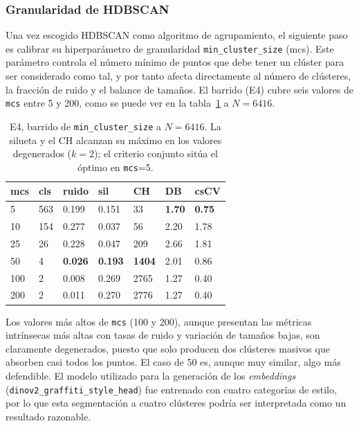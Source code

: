 \subsubsection{Granularidad de HDBSCAN}
\label{subsubsec:res-mincluster}
Una vez escogido HDBSCAN como algoritmo de agrupamiento, el siguiente paso es
calibrar su hiperparámetro de granularidad \texttt{min\_cluster\_size} (mcs).
Este parámetro controla el número mínimo de puntos que debe tener un clúster
para ser considerado como tal, y por tanto afecta directamente al número de
clústeres, la fracción de ruido y el balance de tamaños. El barrido (E4) cubre
seis valores de \texttt{mcs} entre 5 y 200, como se puede ver en la
tabla~\ref{tab:e4-mcs-6416} a $N=6416$.

\begin{table}[h]
  \centering
{\footnotesize
\begin{tabular}{|p{1.4cm}|p{1.0cm}|p{1.0cm}|p{1.0cm}|p{1.2cm}|p{1.0cm}|p{1.0cm}|} \hline
  \textbf{mcs} & \textbf{cls} & \textbf{ruido} & \textbf{sil} & \textbf{CH} & \textbf{DB} & \textbf{csCV} \\ \hline
    5 & 563 & 0.199 & 0.151 &   33 & \textbf{1.70} & \textbf{0.75} \\ \hline
   10 & 154 & 0.277 & 0.037 &   56 & 2.20 & 1.78 \\ \hline
   25 &  26 & 0.228 & 0.047 &  209 & 2.66 & 1.81 \\ \hline
   50 &   4 & \textbf{0.026} & \textbf{0.193} & \textbf{1404} & 2.01 & 0.86 \\ \hline
  100 &   2 & 0.008 & 0.269 & 2765 & 1.27 & 0.40 \\ \hline
  200 &   2 & 0.011 & 0.270 & 2776 & 1.27 & 0.40 \\ \hline
\end{tabular}
}
  \caption[E4, barrido de \texttt{min\_cluster\_size} a $N=6416$]{E4, barrido de \texttt{min\_cluster\_size} a $N=6416$. La silueta y
  el CH alcanzan su máximo en los valores degenerados ($k{=}2$); el criterio
  conjunto sitúa el óptimo en \texttt{mcs}=5. \glosacalidad}
  \label{tab:e4-mcs-6416}
\end{table}

Los valores más altos de \texttt{mcs} (100 y 200), aunque presentan las
métricas intrínsecas más altas con tasas de ruido y variación de tamaños bajas,
son claramente degenerados, puesto que solo producen dos clústeres masivos que
absorben casi todos los puntos. El caso de 50 es, aunque muy similar, algo más
defendible. El modelo utilizado para la generación de los \textit{embeddings}
(\texttt{dinov2\_graffiti\_style\_head}) fue entrenado con cuatro categorías de
estilo, por lo que esta segmentación a cuatro clústeres podría ser interpretada
como un resultado razonable.

